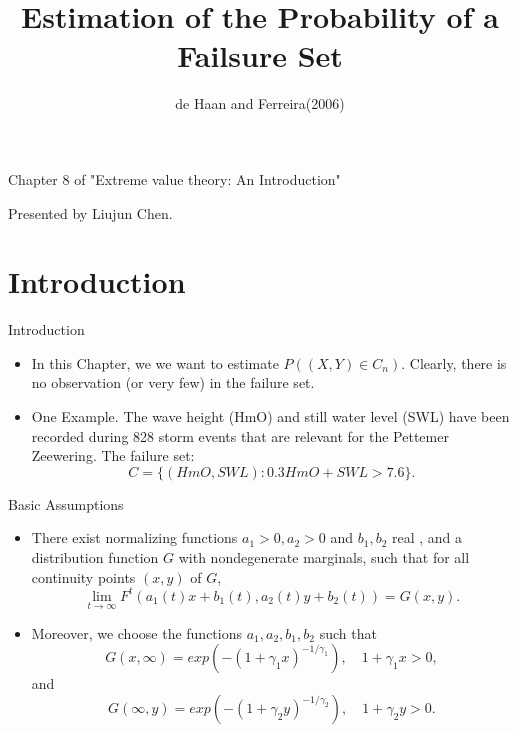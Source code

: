 \documentclass[11pt]{beamer}
\author{de Haan and Ferreira(2006)}
\title{Estimation of the Probability of a Failsure Set}
\begin{document}
\begin{frame}
  \titlepage
  \begin{center}
    Chapter 8 of "Extreme value theory: An Introduction"
  
    \bigskip
    Presented by Liujun Chen.
  \end{center}
  \end{frame}




\section{Introduction}
\begin{frame}{Introduction}
\begin{itemize}
\item In this Chapter, we we want to estimate $P((X,Y)\in C_n)$. Clearly, there is no observation (or very few) in the failure set.
\item One Example. The wave height (HmO) and still water level (SWL) have
been recorded during 828 storm events that are relevant for the Pettemer Zeewering. The failure set:
\begin{displaymath}
C=\{ (HmO,SWL): 0.3HmO + SWL > 7.6\}.
\end{displaymath}
\end{itemize}
\end{frame}


\begin{frame}{Basic Assumptions}
\begin{itemize}
\item There exist normalizing functions $a_1>0,a_2>0$ and $b_1, b_2$ real , and a distribution function $G$ with nondegenerate marginals, such that for all continuity points $(x,y)$ of $G$,
$$\lim_{t \to \infty} F^t(a_1(t)x+b_1(t),a_2(t)y+b_2(t))=G(x,y).$$
\item Moreover, we choose the functions $a_1,a_2,b_1,b_2$ such that
\begin{displaymath}
G(x,\infty)=exp(-(1+\gamma_1x)^{-1/\gamma_1}), \quad 1+\gamma_1 x>0,
\end{displaymath}
and
\begin{displaymath}
G(\infty,y)=exp(-(1+\gamma_2y)^{-1/\gamma_2}), \quad 1+\gamma_2 y>0.
\end{displaymath}
\end{itemize}
\end{frame}
\end{document}
